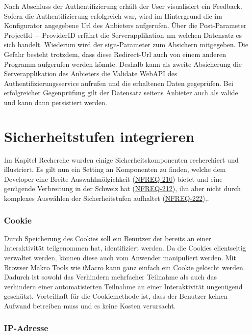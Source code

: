 Nach Abschluss der Authentifizierung erhält der User visualisiert ein
Feedback. Sofern die Authentifizierung erfolgreich war, wird im
Hintergrund die im Konfigurator angegebene Url des Anbieters aufgerufen.
Über die Post-Parameter ProjectId + ProviderID erfährt die
Serverapplikation um welchen Datensatz es sich handelt. Wiederum wird
der sign-Parameter zum Absichern mitgegeben. Die Gefahr besteht
trotzdem, dass diese Redirect-Url auch von einem anderen Programm
aufgerufen werden könnte. Deshalb kann als zweite Absicherung die
Serverapplikation des Anbieters die Validate WebAPI des
Authentifizierungsservice aufrufen und die erhaltenen Daten gegeprüfen.
Bei erfolgreicher Gegenprüfung gilt der Datensatz seitens Anbieter auch
als valide und kann dann persistiert werden.

\newpage

\section{Sicherheitstufen
integrieren}\label{sicherheitstufen-integrieren}

Im Kapitel Recherche wurden einige Sicherheitskomponenten recherchiert
und illustriert. Es gilt nun ein Setting an Komponenten zu finden,
welche dem Developer eine Breite Auswahlmölgichkeit
(\protect\hyperlink{ux5cux23ux5cux23NFREQ-210}{NFREQ-210}) bietet und
eine genügende Verbreitung in der Schweiz hat
(\protect\hyperlink{ux5cux23ux5cux23NFREQ-212}{NFREQ-212}), ihn aber
nicht durch komplexes Auswählen der Sicherheitstufen aufhaltet
(\protect\hyperlink{ux5cux23ux5cux23NFREQ-222}{NFREQ-222}),.

\subsubsection{Cookie}\label{cookie-1}

Durch Speicherung des Cookies soll ein Benutzer der bereits an einer
Interaktivität teilgenommen hat, identifiziert werden. Da die Cookies
clientseitig verwaltet werden, können diese auch vom Anwender
manipuliert werden. Mit Browser Makro Tools wie iMacro kann ganz einfach
ein Cookie gelöscht werden. Dadurch ist sowohl das Verhindern mehrfacher
Teilnahme als auch das verhindern einer automatisierten Teilnahme an
einer Interaktivität ungenügend geschützt. Vorteilhaft für die
Cookiemethode ist, dass der Benutzer keinen Aufwand betreiben muss und
es keine Kosten verursacht.

\subsubsection{IP-Adresse}\label{ip-adresse-1}


